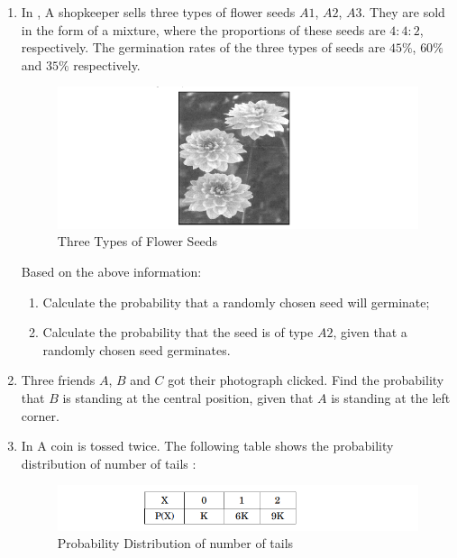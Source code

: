 \begin{enumerate}[label=\thesection.\arabic*.,ref=\thesection.\theenumi]
\item In , A shopkeeper sells three types of flower seeds $A1$, $A2$, $A3$. They are sold in the form of a mixture, where the proportions of these seeds are $4:4:2$, respectively. The germination rates of the three types of seeds are $45\%$, $60\%$ and $35\%$ respectively.

\begin{figure}[H]
        \centering
        \includegraphics[width=\columnwidth]{./figs/Screenshot (23).png}
        \caption{Three Types of Flower Seeds}
        \label{fig:fig2.png}
    \end{figure}

    Based on the above information:
    
    \begin{enumerate}[label=(\alph*)]
    
 \item Calculate the probability that a randomly chosen seed will germinate;
 
 \item Calculate the probability that the seed is of type $A2$, given that a randomly chosen seed germinates.

\end{enumerate}

\item Three friends $A$, $B$ and $C$ got their photograph clicked. Find the 
probability that $B$ is standing at the central position, given that $A$ is 
standing at the left corner. 

\item In  A coin is tossed twice. The following table shows the probability 
distribution of number of tails :
\begin{figure}[H]
        \centering
        \includegraphics[width=\columnwidth]{./figs/Screenshot (28).png}
        \caption{Probability Distribution of number of tails}
        \label{fig:fig3.png}
    \end{figure}


\end{enumerate}
